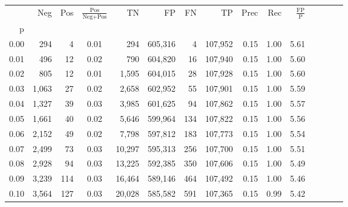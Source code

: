 \begin{tabular}{rrrcrrrrrrrrrrr}
\toprule
{} &     Neg &    Pos & $\frac{\text{Pos}}{\text{Neg}+\text{Pos}}$ &       TN &       FP &       FN &       TP &  Prec &   Rec & $\frac{\text{FP}}{\text{P}}$ \\
p    &         &        &                                            &          &          &          &          &       &       &                              \\
\midrule
0.00 &     294 &      4 &                                       0.01 &      294 &  605,316 &        4 &  107,952 &  0.15 &  1.00 &                         5.61 \\
0.01 &     496 &     12 &                                       0.02 &      790 &  604,820 &       16 &  107,940 &  0.15 &  1.00 &                         5.60 \\
0.02 &     805 &     12 &                                       0.01 &    1,595 &  604,015 &       28 &  107,928 &  0.15 &  1.00 &                         5.60 \\
0.03 &   1,063 &     27 &                                       0.02 &    2,658 &  602,952 &       55 &  107,901 &  0.15 &  1.00 &                         5.59 \\
0.04 &   1,327 &     39 &                                       0.03 &    3,985 &  601,625 &       94 &  107,862 &  0.15 &  1.00 &                         5.57 \\
0.05 &   1,661 &     40 &                                       0.02 &    5,646 &  599,964 &      134 &  107,822 &  0.15 &  1.00 &                         5.56 \\
0.06 &   2,152 &     49 &                                       0.02 &    7,798 &  597,812 &      183 &  107,773 &  0.15 &  1.00 &                         5.54 \\
0.07 &   2,499 &     73 &                                       0.03 &   10,297 &  595,313 &      256 &  107,700 &  0.15 &  1.00 &                         5.51 \\
0.08 &   2,928 &     94 &                                       0.03 &   13,225 &  592,385 &      350 &  107,606 &  0.15 &  1.00 &                         5.49 \\
0.09 &   3,239 &    114 &                                       0.03 &   16,464 &  589,146 &      464 &  107,492 &  0.15 &  1.00 &                         5.46 \\
0.10 &   3,564 &    127 &                                       0.03 &   20,028 &  585,582 &      591 &  107,365 &  0.15 &  0.99 &                         5.42 \\

\end{tabular}
